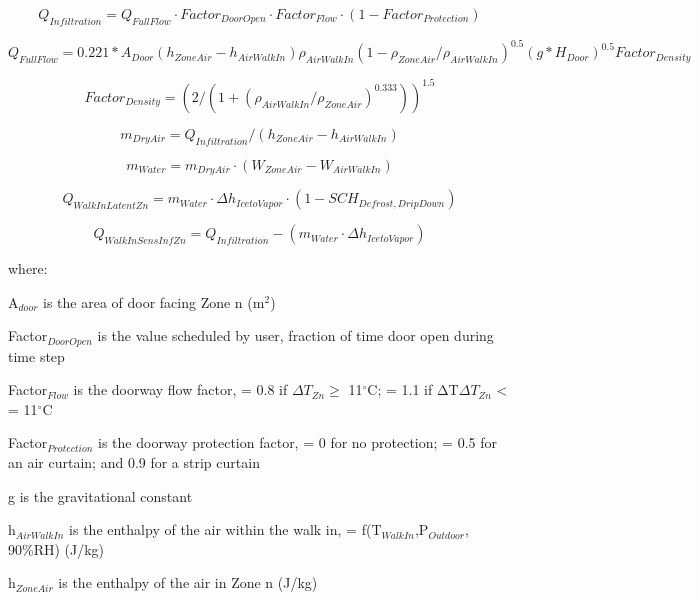 \begin{equation}
Q_{Infiltration} = Q_{FullFlow} \cdot Factor_{DoorOpen} \cdot Factor_{Flow} \cdot (1 - Factor_{Protection})
\end{equation}

\begin{equation}
Q_{FullFlow} = 0.221*A_{Door}(h_{ZoneAir}-h_{AirWalkIn})\rho_{AirWalkIn}(1-\rho_{ZoneAir}/\rho_{AirWalkIn})^{0.5}(g*H_{Door})^{0.5}Factor_{Density}
\end{equation}

\begin{equation}
Factor_{Density} = (2 /(1 + (\rho_{AirWalkIn} / \rho_{ZoneAir})^{0.333}))^{1.5}
\end{equation}

\begin{equation}
m_{DryAir} = Q_{Infiltration} / (h_{ZoneAir} - h_{AirWalkIn})
\end{equation}

\begin{equation}
m_{Water} = m_{DryAir} \cdot (W_{ZoneAir} - W_{AirWalkIn})
\end{equation}

\begin{equation}
Q_{WalkInLatentZn} = m_{Water} \cdot \Delta h_{IcetoVapor} \cdot (1 - SCH_{Defrost,DripDown})
\end{equation}

\begin{equation}
Q_{WalkInSensInfZn} = Q_{Infiltration} - (m_{Water} \cdot \Delta h_{IcetoVapor})
\end{equation}

where:

A\(_{door}\) is the area of door facing Zone n (m\(^{2}\))

Factor\(_{DoorOpen}\) is the value scheduled by user, fraction of time door open during time step

Factor\(_{Flow}\) is the doorway flow factor, = 0.8 if \(\Delta T_{Zn} \geq\) 11\(^{\circ}\)C; = 1.1 if ΔT\(\Delta T_{Zn}\) \textless{} = 11\(^{\circ}\)C

Factor\(_{Protection}\) is the doorway protection factor, = 0 for no protection; = 0.5 for an air curtain; and 0.9 for a strip curtain

g is the gravitational constant

h\(_{AirWalkIn}\) is the enthalpy of the air within the walk in, = f(T\(_{WalkIn}\),P\(_{Outdoor}\), 90\%RH) (J/kg)

h\(_{ZoneAir}\) is the enthalpy of the air in Zone n (J/kg)

